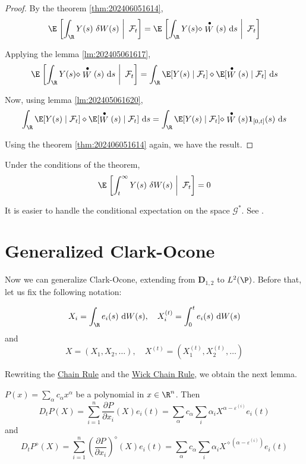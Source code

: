   \begin{proof}
    By the theorem \ref{thm:202406051614},
    \[
      \E \left. \left[ \int_\R Y(s) ~\delta W(s) ~\right|~ \mathcal{F}_t \right] = \E \left. \left[ \int_\R Y(s) \diamond \stackrel{\bullet}{W}(s) ~\mathrm{d}s ~\right|~ \mathcal{F}_t \right]
    \]

    Applying the lemma \ref{lm:202405061617}, 
    \[
      \E \left. \left[ \int_\R Y(s) \diamond \stackrel{\bullet}{W}(s) ~\mathrm{d}s ~\right|~ \mathcal{F}_t \right] = \int_\R \E [Y(s) \mid \mathcal{F}_t] \diamond \E [\stackrel{\bullet}{W}(s) \mid \mathcal{F}_t] ~\mathrm{d}s
    \]

    Now, using lemma \ref{lm:202405061620},
    \[
      \int_\R \E [Y(s) \mid \mathcal{F}_t] \diamond \E [\stackrel{\bullet}{W}(s) \mid \mathcal{F}_t] ~\mathrm{d}s = \int_\R \E [Y(s) \mid \mathcal{F}_t] \diamond \stackrel{\bullet}{W}(s) \mathbf{1}_{[0,t]}(s) ~\mathrm{d}s
    \]

    Using the theorem \ref{thm:202406051614} again, we have the result.
  \end{proof}
  
  \begin{corollary}
    Under the conditions of the theorem,
    \[
      \E \left. \left[ \int_t^\infty Y(s) ~\delta W(s) ~\right|~ \mathcal{F}_t \right] = 0
    \]
  \end{corollary}

  It is easier to handle the conditional expectation on the space $\mathcal{G}^\ast$. See \cite{nunno2008malliavin}.

  \section{Generalized Clark-Ocone}

Now we can generalize Clark-Ocone, extending from $\mathbf{D}_{1,2}$ to $L^2(\P)$. Before that, let us fix the following notation:

\[
  X_i = \int_\R e_i(s) ~\mathrm{d}W(s), \quad X_i^{(t)} = \int_0^t e_i(s) ~\mathrm{d}W(s)
\]
and 
\[
  X = (X_1, X_2, \ldots ), \quad X^{(t)} =  (X_1^{(t)}, X_2^{(t)}, \ldots )
\]

Rewriting the \hyperref[thm:hida-chain-rule]{Chain Rule} and the \hyperref[thm:wick-chain]{Wick Chain Rule}, we obtain the next lemma. 

\begin{lemma}\label{lm:202405281604}
  $P(x) = \sum_{\alpha} c_\alpha x^\alpha$ be a polynomial in $x \in \R^n$. Then 
  \[
      D_t P(X) = \sum_{i=1}^n \frac{\partial P}{\partial x_i} (X) e_i(t) = \sum_\alpha c_\alpha \sum_i \alpha_i X^{\alpha - \varepsilon^{(i)}} e_i(t)
  \]
  and
  \[
    D_t P^\diamond (X) = \sum_{i=1}^n \left( \frac{\partial P}{\partial x_i} \right)^\diamond (X) e_i(t) = \sum_\alpha c_\alpha \sum_i \alpha_i X^{\diamond (\alpha - \varepsilon^{(i)})} e_i(t)
  \]
\end{lemma}

